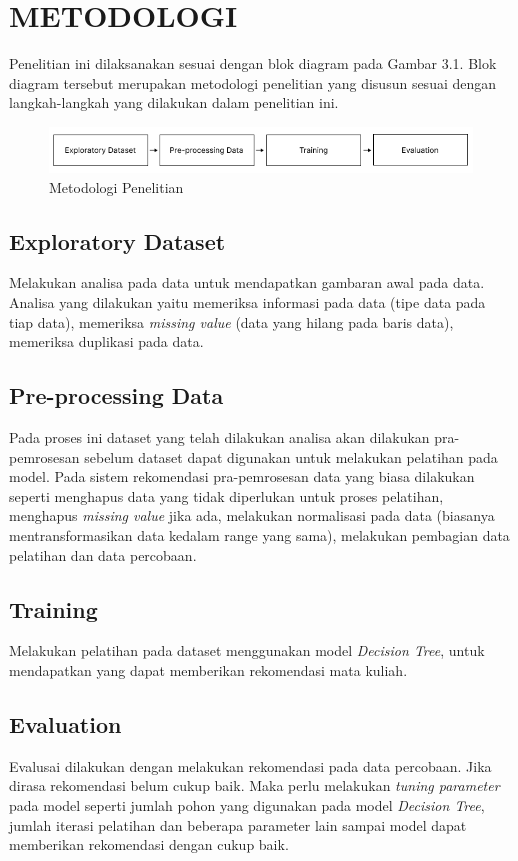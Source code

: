 \section{METODOLOGI}

Penelitian ini dilaksanakan sesuai dengan blok diagram pada Gambar 3.1. Blok diagram tersebut
merupakan metodologi penelitian yang disusun sesuai dengan langkah-langkah yang dilakukan dalam penelitian ini.

\begin{figure} [ht] \centering
  \includegraphics[width=160mm]{gambar/metodologi.png}
  \caption{Metodologi Penelitian}
\end{figure}


\subsection{Exploratory Dataset}
Melakukan analisa pada data untuk mendapatkan gambaran awal pada data. Analisa yang dilakukan yaitu
memeriksa informasi pada data (tipe data pada tiap data), memeriksa \emph{missing value} {(data yang hilang pada baris data)},
memeriksa duplikasi pada data.


\subsection{Pre-processing Data}
Pada proses ini dataset yang telah dilakukan analisa akan dilakukan pra-pemrosesan sebelum dataset dapat digunakan
untuk melakukan pelatihan pada model. Pada sistem rekomendasi pra-pemrosesan data yang biasa dilakukan seperti menghapus data
yang tidak diperlukan untuk proses pelatihan, menghapus \emph{missing value} jika ada, melakukan normalisasi pada data (biasanya mentransformasikan data kedalam range yang sama),
melakukan pembagian data pelatihan dan data percobaan.

\subsection{Training}
Melakukan pelatihan pada dataset menggunakan model \emph{Decision Tree}, untuk mendapatkan yang dapat memberikan rekomendasi
mata kuliah.

\subsection{Evaluation}
Evalusai dilakukan dengan melakukan rekomendasi pada data percobaan. Jika dirasa rekomendasi belum cukup baik. Maka perlu melakukan
\emph{tuning parameter} pada model seperti jumlah pohon yang digunakan pada model \emph{Decision Tree}, jumlah iterasi pelatihan dan
beberapa parameter lain sampai model dapat memberikan rekomendasi dengan cukup baik.

